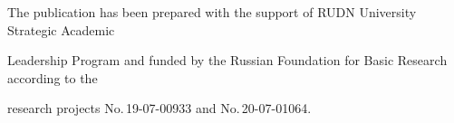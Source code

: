 







 \Ack


  \noindent


  The publication has been prepared with the support of RUDN University Strategic Academic 


Leadership Program and funded by the Russian Foundation for Basic Research according to the 


research projects No.\,19-07-00933 and No.\,20-07-01064. 













\renewcommand{\bibname}{\protect\rmfamily References}







